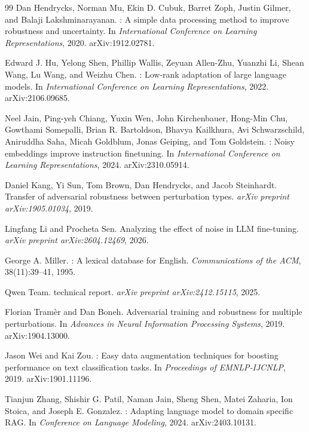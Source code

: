 \documentclass[11pt]{article}
\begin{document}
\begin{thebibliography}{99}
Dan Hendrycks, Norman Mu, Ekin D. Cubuk, Barret Zoph, Justin Gilmer, and Balaji Lakshminarayanan.
: A simple data processing method to improve robustness and uncertainty.
\newblock In \emph{International Conference on Learning Representations}, 2020.
\newblock arXiv:1912.02781.

Edward J. Hu, Yelong Shen, Phillip Wallis, Zeyuan Allen-Zhu, Yuanzhi Li, Shean Wang, Lu Wang, and Weizhu Chen.
: Low-rank adaptation of large language models.
\newblock In \emph{International Conference on Learning Representations}, 2022.
\newblock arXiv:2106.09685.

Neel Jain, Ping-yeh Chiang, Yuxin Wen, John Kirchenbauer, Hong-Min Chu, Gowthami Somepalli, Brian R. Bartoldson, Bhavya Kailkhura, Avi Schwarzschild, Aniruddha Saha, Micah Goldblum, Jonas Geiping, and Tom Goldstein.
: Noisy embeddings improve instruction finetuning.
\newblock In \emph{International Conference on Learning Representations}, 2024.
\newblock arXiv:2310.05914.

Daniel Kang, Yi Sun, Tom Brown, Dan Hendrycks, and Jacob Steinhardt.
\newblock Transfer of adversarial robustness between perturbation types.
\newblock \emph{arXiv preprint arXiv:1905.01034}, 2019.

Lingfang Li and Procheta Sen.
\newblock Analyzing the effect of noise in {LLM} fine-tuning.
\newblock \emph{arXiv preprint arXiv:2604.12469}, 2026.

George A. Miller.
: A lexical database for {English}.
\newblock \emph{Communications of the ACM}, 38(11):39--41, 1995.

Qwen Team.
 technical report.
\newblock \emph{arXiv preprint arXiv:2412.15115}, 2025.

Florian Tram{\`e}r and Dan Boneh.
\newblock Adversarial training and robustness for multiple perturbations.
\newblock In \emph{Advances in Neural Information Processing Systems}, 2019.
\newblock arXiv:1904.13000.

Jason Wei and Kai Zou.
: Easy data augmentation techniques for boosting performance on text classification tasks.
\newblock In \emph{Proceedings of EMNLP-IJCNLP}, 2019.
\newblock arXiv:1901.11196.

Tianjun Zhang, Shishir G. Patil, Naman Jain, Sheng Shen, Matei Zaharia, Ion Stoica, and Joseph E. Gonzalez.
: Adapting language model to domain specific {RAG}.
\newblock In \emph{Conference on Language Modeling}, 2024.
\newblock arXiv:2403.10131.

\end{thebibliography}
\end{document}
